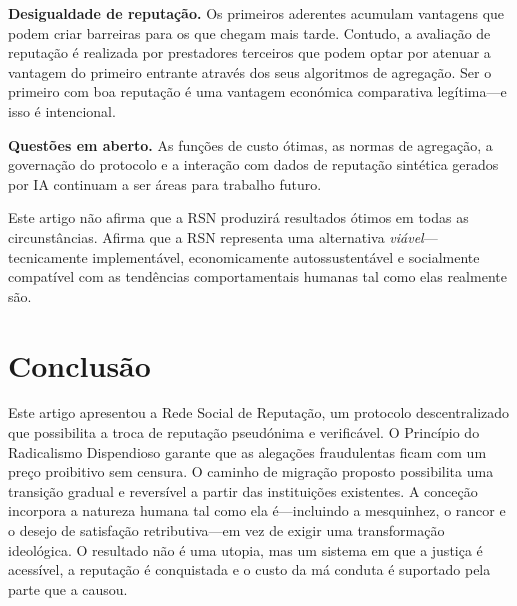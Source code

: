 \documentclass[11pt,a4paper,twocolumn]{article}
\begin{document}
\textbf{Desigualdade de reputação.} Os primeiros aderentes acumulam vantagens que podem criar barreiras para os que chegam mais tarde. Contudo, a avaliação de reputação é realizada por prestadores terceiros que podem optar por atenuar a vantagem do primeiro entrante através dos seus algoritmos de agregação. Ser o primeiro com boa reputação é uma vantagem económica comparativa legítima---e isso é intencional.

\textbf{Questões em aberto.} As funções de custo ótimas, as normas de agregação, a governação do protocolo e a interação com dados de reputação sintética gerados por IA continuam a ser áreas para trabalho futuro.

Este artigo não afirma que a RSN produzirá resultados ótimos em todas as circunstâncias. Afirma que a RSN representa uma alternativa \emph{viável}---tecnicamente implementável, economicamente autossustentável e socialmente compatível com as tendências comportamentais humanas tal como elas realmente são.

\section{Conclusão}

Este artigo apresentou a Rede Social de Reputação, um protocolo descentralizado que possibilita a troca de reputação pseudónima e verificável. O Princípio do Radicalismo Dispendioso garante que as alegações fraudulentas ficam com um preço proibitivo sem censura. O caminho de migração proposto possibilita uma transição gradual e reversível a partir das instituições existentes. A conceção incorpora a natureza humana tal como ela é---incluindo a mesquinhez, o rancor e o desejo de satisfação retributiva---em vez de exigir uma transformação ideológica. O resultado não é uma utopia, mas um sistema em que a justiça é acessível, a reputação é conquistada e o custo da má conduta é suportado pela parte que a causou.


\end{document}
